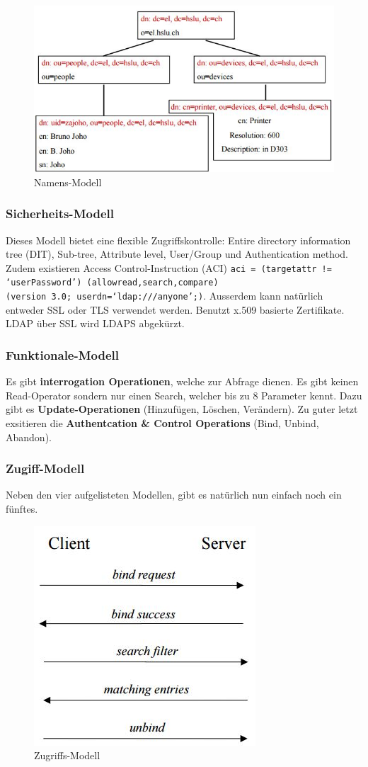 \begin{figure}[h!]
\centering
\includegraphics[width=0.7\linewidth]{fig/ldap-namens-modell}
\caption{Namens-Modell}
\label{fig:ldap-namens-modell}
\end{figure}

\subsubsection{Sicherheits-Modell}
Dieses Modell bietet eine flexible Zugriffskontrolle: Entire directory information tree (DIT), Sub-tree, Attribute level, User/Group und Authentication method. Zudem existieren Access Control-Instruction (ACI) \verb|aci = (targetattr != ‘userPassword’) (allowread,search,compare)| \\ \verb|(version 3.0; userdn=‘ldap:///anyone’;)|. Ausserdem kann natürlich entweder SSL oder TLS verwendet werden. Benutzt x.509 basierte Zertifikate. LDAP über SSL wird LDAPS abgekürzt.

\subsubsection{Funktionale-Modell}
Es gibt \textbf{interrogation Operationen}, welche zur Abfrage dienen. Es gibt keinen Read-Operator sondern nur einen Search, welcher bis zu 8 Parameter kennt. Dazu gibt es \textbf{Update-Operationen} (Hinzufügen, Löschen, Verändern). Zu guter letzt exsitieren die \textbf{Authentcation \& Control Operations} (Bind, Unbind, Abandon).

\subsubsection{Zugiff-Modell}
Neben den vier aufgelisteten Modellen, gibt es natürlich nun einfach noch ein fünftes. 
\begin{figure}[h!]
\centering
\includegraphics[width=0.4\linewidth]{fig/ldap-zugriffs-modell}
\caption{Zugriffs-Modell}
\label{fig:ldap-zugriffs-modell}
\end{figure}


